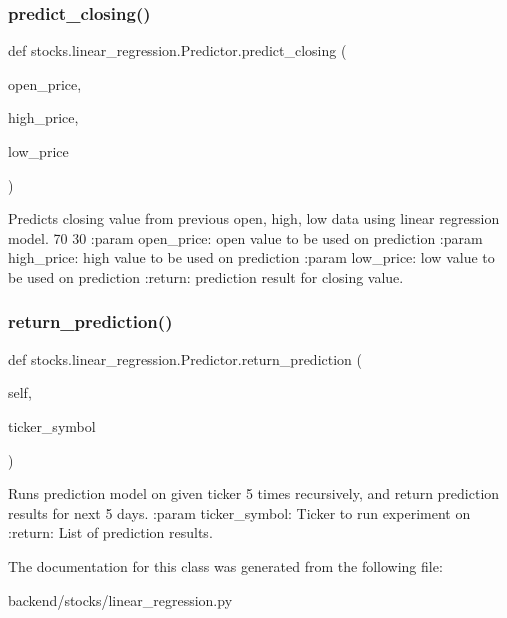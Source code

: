 \subsubsection{\texorpdfstring{predict\+\_\+closing()}{predict\_closing()}}
{\footnotesize\ttfamily def stocks.\+linear\+\_\+regression.\+Predictor.\+predict\+\_\+closing (\begin{DoxyParamCaption}\item[{}]{open\+\_\+price,  }\item[{}]{high\+\_\+price,  }\item[{}]{low\+\_\+price }\end{DoxyParamCaption})\hspace{0.3cm}{\ttfamily [static]}}

\begin{DoxyVerb}Predicts closing value from previous open, high, low data using linear
regression model. 70%
30%
:param open_price: open value to be used on prediction
:param high_price: high value to be used on prediction
:param low_price: low value to be used on prediction
:return: prediction result for closing value.
\end{DoxyVerb}
 \mbox{\label{classstocks_1_1linear__regression_1_1_predictor_a87e63495df1ef8625b2321852477c34c}} 
\subsubsection{\texorpdfstring{return\+\_\+prediction()}{return\_prediction()}}
{\footnotesize\ttfamily def stocks.\+linear\+\_\+regression.\+Predictor.\+return\+\_\+prediction (\begin{DoxyParamCaption}\item[{}]{self,  }\item[{}]{ticker\+\_\+symbol }\end{DoxyParamCaption})}

\begin{DoxyVerb}Runs prediction model on given ticker 5 times recursively, and return
prediction results for next 5 days.
:param ticker_symbol: Ticker to run experiment on
:return: List of prediction results.
\end{DoxyVerb}
 

The documentation for this class was generated from the following file\+:\begin{DoxyCompactItemize}
\item 
backend/stocks/linear\+\_\+regression.\+py\end{DoxyCompactItemize}

